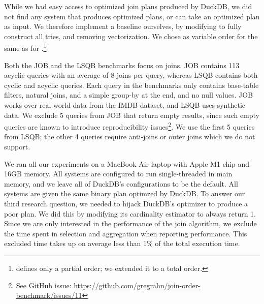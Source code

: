 While we had easy access to optimized join plans produced by DuckDB,
we did not find any system that produces optimized \GJ plans, 
or can take an optimized plan as input.
We therefore implement a \GJ baseline ourselves,
by modifying \FJ to fully construct all tries, and removing
vectorization.  We chose as variable order for \GJ the same as for
\FJ.\footnote{\FJ defines only a partial order; we extended it to a
  total order.}


Both  the JOB and the LSQB benchmarks  focus on joins.
JOB contains 113 acyclic queries with an average of 8 joins per query,
  whereas LSQB contains both cyclic and acyclic queries.
Each query in the benchmarks only contains base-table filters, 
  natural joins, and a simple group-by at the end,
  and no null values.
JOB works over real-world data from the IMDB dataset, 
  and LSQB uses synthetic data.
We exclude 5 queries from JOB that return empty results, 
  since such empty queries are known to introduce reproducibility issues\footnote{
    See GitHub issue: \url{https://github.com/gregrahn/join-order-benchmark/issues/11}
  }.
We use the first 5 queries from LSQB; the other 4 queries require 
  anti-joins or outer joins which we do not support.

We ran all our experiments on a MacBook Air laptop with Apple M1 chip and 16GB memory. 
All systems are configured to run single-threaded in main memory, 
  and we leave all of DuckDB's configurations to be the default.
All systems are given the same binary plan optimzed by DuckDB.
To answer our third research question, 
  we needed to hijack DuckDB's optimizer to produce a poor plan.
We did this by modifying its cardinality estimator to always return 1.
Since we are only interested in the performance of the join algorithm, 
  we exclude the time spent in selection and aggregation 
  when reporting performance.
This excluded time takes up on average less than 1\% of the total execution time.

